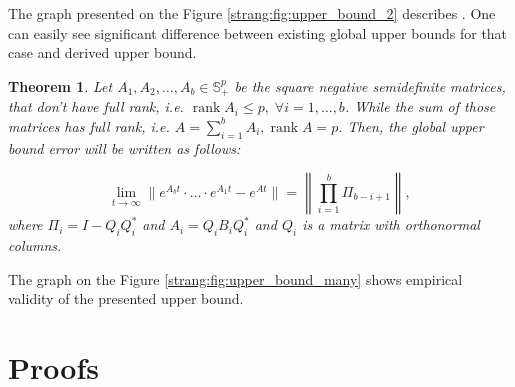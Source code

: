 \documentclass{article}
\newtheorem{theorem}{Theorem}
\begin{document}
The graph presented on the Figure \ref{strang:fig:upper_bound_2} describes . One can easily see significant difference between existing global upper bounds for that case \citet{sheng1994global} and derived upper bound.

\begin{theorem}\label{strang:theorem_uppbound}
    Let $A_1, A_2, \ldots, A_b \in \mathbb{S}^p_{+}$ be the square negative semidefinite matrices, that don't have full rank, i.e. $\operatorname{rank}{A_i} \leq p, \;\forall i = 1, \ldots, b$. While the sum of those matrices has full rank, i.e. $A = \sum\limits_{i=1}^b A_i, \operatorname{rank}{A} = p$. Then, the global upper bound error will be written as follows:

    \begin{equation}\label{strang:global_error_upper_bound}
        \lim_{t \to \infty}\| e^{A_bt} \cdot \ldots \cdot e^{A_1t} - e^{At}\| = \left\|\prod\limits_{i=1}^b \Pi_{b-i+1}\right\|,
    \end{equation}
    where $\Pi_i = I - Q_iQ_i^*$ and $A_i = Q_iB_iQ_i^*$ and $Q_i$ is a matrix with orthonormal columns. 
\end{theorem}

The graph on the Figure \ref{strang:fig:upper_bound_many} shows empirical validity of the presented upper bound.



\section{Proofs}

\llsls*
\end{document}
